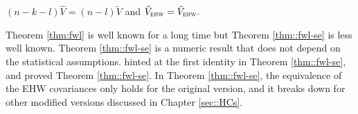  
 
 \begin{theorem}
 \label{thm::fwl-se}
 $(n-k-l)\hat{V} = (n-l)  \tilde{V} $ and $\hat{V}_{\textsc{ehw}} = \tilde{V}_{\textsc{ehw}}.$
 \end{theorem}
 
 
Theorem \ref{thm:fwl} is well known for a long time but Theorem \ref{thm::fwl-se} is less well known.
Theorem \ref{thm::fwl-se} is a numeric result that does not depend on the statistical assumptions. 
\citet{lovell1963seasonal} hinted at the first identity in Theorem \ref{thm::fwl-se}, and 
\citet{ding2021frisch} proved Theorem \ref{thm::fwl-se}. 
In Theorem \ref{thm::fwl-se}, the equivalence of the EHW covariances only holds for the original version, and it breaks down for other modified versions discussed in Chapter \ref{sec::HCs}. 





